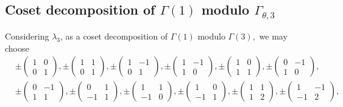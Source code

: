 \documentclass[12pt]{article}
\theoremstyle{definition}
\numberwithin{equation}{section}
\numberwithin{theorem}{section}
\begin{document}
\subsection{Coset decomposition of $\Gamma(1) $ modulo $\Gamma_{\theta,3}$ }
Considering $\lambda_3$, 
as a  coset decomposition of $\Gamma(1)$ modulo $\Gamma(3),$ 
we may choose 
\begin{align*}
&
\pm 
\begin{pmatrix}
1 & 0 \\
0 & 1
\end{pmatrix}, 
\pm 
\begin{pmatrix}
1 & 1 \\
0 & 1
\end{pmatrix}, 
\pm 
\begin{pmatrix}
1 & -1 \\
0 & 1
\end{pmatrix}, 
\pm 
\begin{pmatrix}
1 & -1 \\
1 &0
\end{pmatrix}, 
\pm 
\begin{pmatrix}
1 & 0 \\
1 & 1
\end{pmatrix}, 
\pm 
\begin{pmatrix}
0 & -1 \\
1 & 0
\end{pmatrix},   \\
&
\pm 
\begin{pmatrix}
0 & -1 \\
1 & 1
\end{pmatrix}, 
\pm 
\begin{pmatrix}
0 & 1 \\
-1 & 1
\end{pmatrix}, 
\pm 
\begin{pmatrix}
1 & 1 \\
-1 & 0
\end{pmatrix}, 
\pm 
\begin{pmatrix}
1 & 0 \\
-1 & 1
\end{pmatrix}, 
\pm 
\begin{pmatrix}
1 & 1 \\
1 & 2
\end{pmatrix}, 
\pm 
\begin{pmatrix}
1 & -1 \\
-1 & 2
\end{pmatrix},
\end{align*}
\end{document}
